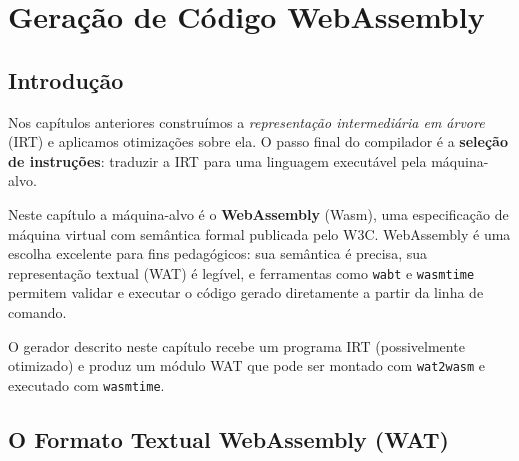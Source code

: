 \chapter{Geração de Código WebAssembly}\label{chap:wat}

\section{Introdução}

Nos capítulos anteriores construímos a \emph{representação intermediária em
árvore} (IRT) e aplicamos otimizações sobre ela.  O passo final do compilador é
a \textbf{seleção de instruções}: traduzir a IRT para uma linguagem executável
pela máquina-alvo.

Neste capítulo a máquina-alvo é o \textbf{WebAssembly} (Wasm), uma
especificação de máquina virtual com semântica formal publicada pelo W3C.
WebAssembly é uma escolha excelente para fins pedagógicos: sua semântica é
precisa, sua representação textual (WAT) é legível, e ferramentas como
\texttt{wabt} e \texttt{wasmtime} permitem validar e executar o código gerado
diretamente a partir da linha de comando.

\begin{center}
\end{center}

O gerador descrito neste capítulo recebe um programa IRT (possivelmente
otimizado) e produz um módulo WAT que pode ser montado com \texttt{wat2wasm} e
executado com \texttt{wasmtime}.

\section{O Formato Textual WebAssembly (WAT)}\label{sec:wat-syntax}


